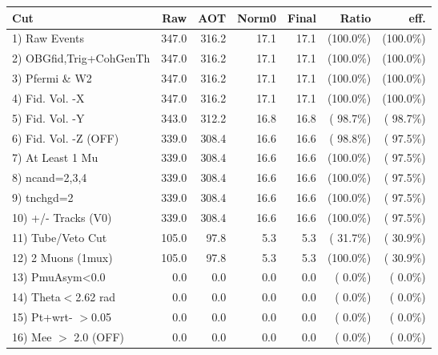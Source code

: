  \begin{table}[h!]\centering
 \begin{tabular}{||l||r|r|r|r|r|r||}
 \hline
 \hline
 Cut & Raw & AOT & Norm0 & Final & Ratio & eff.       \\
 \hline
  1) Raw Events           &        347.0 &        316.2 &         17.1 &         17.1 & (100.0\%) & (100.0\%) \\
  2) OBGfid,Trig+CohGenTh &        347.0 &        316.2 &         17.1 &         17.1 & (100.0\%) & (100.0\%) \\
  3) Pfermi \& W2         &        347.0 &        316.2 &         17.1 &         17.1 & (100.0\%) & (100.0\%) \\
  4) Fid. Vol. -X         &        347.0 &        316.2 &         17.1 &         17.1 & (100.0\%) & (100.0\%) \\
  5) Fid. Vol. -Y         &        343.0 &        312.2 &         16.8 &         16.8 & ( 98.7\%) & ( 98.7\%) \\
  6) Fid. Vol. -Z (OFF)   &        339.0 &        308.4 &         16.6 &         16.6 & ( 98.8\%) & ( 97.5\%) \\
  7) At Least 1 Mu        &        339.0 &        308.4 &         16.6 &         16.6 & (100.0\%) & ( 97.5\%) \\
  8) ncand=2,3,4          &        339.0 &        308.4 &         16.6 &         16.6 & (100.0\%) & ( 97.5\%) \\
  9) tnchgd=2             &        339.0 &        308.4 &         16.6 &         16.6 & (100.0\%) & ( 97.5\%) \\
 10) +/- Tracks (V0)      &        339.0 &        308.4 &         16.6 &         16.6 & (100.0\%) & ( 97.5\%) \\
 11) Tube/Veto Cut        &        105.0 &         97.8 &          5.3 &          5.3 & ( 31.7\%) & ( 30.9\%) \\
 12) 2 Muons (1mux)       &        105.0 &         97.8 &          5.3 &          5.3 & (100.0\%) & ( 30.9\%) \\
 13) PmuAsym<0.0          &          0.0 &          0.0 &          0.0 &          0.0 & (  0.0\%) & (  0.0\%) \\
 14) Theta$<$2.62 rad     &          0.0 &          0.0 &          0.0 &          0.0 & (  0.0\%) & (  0.0\%) \\
 15) Pt+wrt- $>$0.05      &          0.0 &          0.0 &          0.0 &          0.0 & (  0.0\%) & (  0.0\%) \\
 16) Mee $>$ 2.0  (OFF)   &          0.0 &          0.0 &          0.0 &          0.0 & (  0.0\%) & (  0.0\%) \\

\end{tabular}
\end{table}
